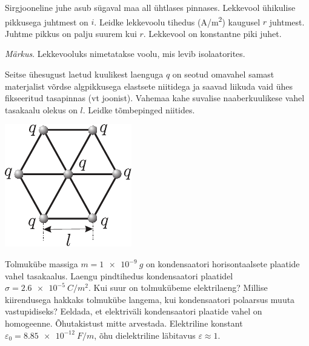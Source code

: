\documentclass[10pt, twoside]{article}
\begin{document}
{%

Sirgjooneline juhe asub sügaval maa all ühtlases pinnases. Lekkevool ühikulise pikkusega juhtmest on $i$. Leidke lekkevoolu tihedus (\si{A/m^2}) kaugusel $r$ juhtmest. Juhtme pikkus on palju suurem kui $r$. Lekkevool on konstantne piki juhet.

\emph{Märkus}. Lekkevooluks nimetatakse voolu, mis levib isolaatorites.
\probend
\bigskip


Seitse ühesugust laetud kuulikest laenguga $q$ on seotud omavahel samast materjalist võrdse algpikkusega elastsete niitidega ja saavad liikuda vaid ühes fikseeritud tasapinnas (vt joonist). Vahemaa kahe suvalise naaberkuulikese vahel tasakaalu olekus on $l$. Leidke tõmbepinged niitides.

\begin{center}
	\includegraphics[width=0.35\linewidth]{2005-lahg-04-yl}
\end{center}
\probend
\bigskip


Tolmukübe massiga $m = \SI{1e-9}{g}$ on kondensaatori horisontaalsete plaatide vahel tasakaalus. Laengu pindtihedus kondensaatori plaatidel $\sigma = \SI{2,6e-5}{C/m^2}$. Kui suur on tolmukübeme elektrilaeng? Millise kiirendusega hakkaks tolmukübe langema, kui kondensaatori polaarsus muuta vastupidiseks? Eeldada, et elektriväli kondensaatori plaatide vahel on homogeenne. Õhutakistust mitte arvestada. Elektriline konstant $\varepsilon_0 = \SI{8,85e-12}{F/m}$, õhu dielektriline läbitavus $\varepsilon \approx 1$.
\probend
\bigskip


}
\end{document}

